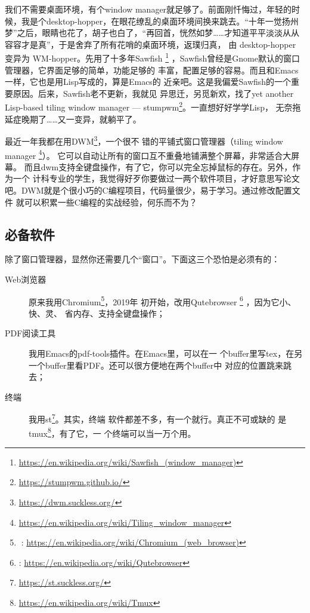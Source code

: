 我们不需要桌面环境，有个window manager就足够了。前面刚忏悔过，年轻的时
候，我是个desktop-hopper，在眼花缭乱的桌面环境间换来跳去。“十年一觉扬州
梦”之后，眼睛也花了，胡子也白了，“再回首，恍然如梦……才知道平平淡淡从从
容容才是真”，于是舍弃了所有花哨的桌面环境，返璞归真，
由 desktop-hopper 变异为 WM-hopper。先用了十多年Sawfish%
\footnote{\url{https://en.wikipedia.org/wiki/Sawfish_(window_manager)}}
，Sawfish曾经是Gnome默认的窗口管理器，它界面足够的简单，功能足够的
丰富，配置足够的容易。而且和Emacs一样，它也是用Lisp写成的，算是Emacs的
近亲吧。这是我偏爱Sawfish的一个重要原因。后来，Sawfish老不更新，我就见
异思迁，另觅新欢，找了yet another Lisp-based tiling window manager ---
stumpwm\footnote{\url{https://stumpwm.github.io/}}。一直想好好学学Lisp，
无奈拖延症晚期了……又一变异，就躺平了。

最近一年我都在用DWM\footnote{\url{https://dwm.suckless.org/}}，一个很不
错的平铺式窗口管理器（tiling window manager%
\footnote{\url{https://en.wikipedia.org/wiki/Tiling_window_manager}}）。%
它可以自动让所有的窗口互不重叠地铺满整个屏幕，非常适合大屏幕。%
而且dwm支持全键盘操作，有了它，你可以完全忘掉鼠标的存在。另外，作为一个
计科专业的学生，我觉得好歹你要做过一两个软件项目，才好意思写论文
吧。DWM就是个很小巧的C编程项目，代码量很少，易于学习。通过修改配置文件
就可以积累一些C编程的实战经验，何乐而不为？

\subsection{必备软件}

除了窗口管理器，显然你还需要几个“窗口”。下面这三个恐怕是必须有的：

\begin{description}
\item[Web浏览器] 原来我用Chromium\footnote{%
    : \url{https://en.wikipedia.org/wiki/Chromium_(web_browser)}}，2019年
  初开始，改用Qutebrowser \footnote{%
    \qutebrowser{}: \url{https://en.wikipedia.org/wiki/Qutebrowser}} ，因为它小、快、灵、
  省内存、支持全键盘操作；
\item[PDF阅读工具] 我用Emacs的pdf-tools插件。在Emacs里，可以在一
  个buffer里写tex，在另一个buffer里看PDF。还可以很方便地在两个buffer中
  对应的位置跳来跳去；
\item[终端] 我用st\footnote{\url{https://st.suckless.org/}}。其实，终端
  软件都差不多，有一个就行。真正不可或缺的
  是tmux\footnote{\url{https://en.wikipedia.org/wiki/Tmux}}，有了它，一
  个终端可以当一万个用。
\end{description}

